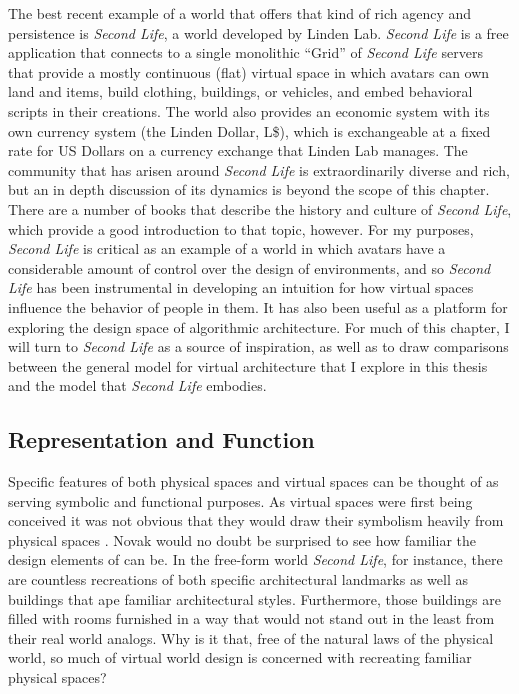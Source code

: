 The best recent example of a world that offers that kind of rich agency and persistence is \emph{Second Life}, a world developed by Linden Lab. \emph{Second Life} is a free application that connects to a single monolithic ``Grid'' of \emph{Second Life} servers that provide a mostly continuous (flat) virtual space in which avatars can own land and items, build clothing, buildings, or vehicles, and embed behavioral scripts in their creations. The world also provides an economic system with its own currency system (the Linden Dollar, L\$), which is exchangeable at a fixed rate for US Dollars on a currency exchange that Linden Lab manages. The community that has arisen around \emph{Second Life} is extraordinarily diverse and rich, but an in depth discussion of its dynamics is beyond the scope of this chapter. There are a number of books that describe the history and culture of \emph{Second Life}, which provide a good introduction to that topic, however. \citep{Au:2008va, Ludlow:2007uu} For my purposes, \emph{Second Life} is critical as an example of a world in which avatars have a considerable amount of control over the design of environments, and so \emph{Second Life} has been instrumental in developing an intuition for how virtual spaces influence the behavior of people in them. It has also been useful as a platform for exploring the design space of algorithmic architecture. For much of this chapter, I will turn to \emph{Second Life} as a source of inspiration, as well as to draw comparisons between the general model for virtual architecture that I explore in this thesis and the model that \emph{Second Life} embodies.

\subsection{Representation and Function}
Specific features of both physical spaces and virtual spaces can be thought of as serving symbolic and functional purposes. As virtual spaces were first being conceived it was not obvious that they would draw their symbolism heavily from physical spaces \citep{Novak:1991ue}. Novak would no doubt be surprised to see how familiar the design elements of can be. In the free-form world \emph{Second Life}, for instance, there are countless recreations of both specific architectural landmarks as well as buildings that ape familiar architectural styles. Furthermore, those buildings are filled with rooms furnished in a way that would not stand out in the least from their real world analogs. Why is it that, free of the natural laws of the physical world, so much of virtual world design is concerned with recreating familiar physical spaces?


